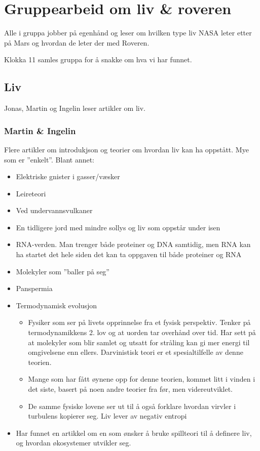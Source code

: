 \documentclass[5p]{elsarticle}
\begin{document}
\section*{Gruppearbeid om liv \& roveren}
Alle i gruppa jobber på egenhånd og leser om hvilken type liv NASA leter etter på Mars og hvordan de leter der med Roveren. 

Klokka 11 samles gruppa for å snakke om hva vi har funnet.

\subsection*{Liv}
Jonas, Martin og Ingelin leser artikler om liv.

\subsubsection*{Martin \& Ingelin}
Flere artikler om introdukjson og teorier om hvordan liv kan ha oppstått. Mye som er ''enkelt''. Blant annet:

\begin{itemize}
\item Elektriske gnister i gasser/væsker
\item Leireteori
\item Ved undervannsvulkaner
\item En tidligere jord med mindre sollys og liv som oppstår under isen
\item RNA-verden. Man trenger både proteiner og DNA samtidig, men RNA kan ha startet det hele siden det kan ta oppgaven til både proteiner og RNA
\item Molekyler som ''baller på seg''
\item Panspermia
\item Termodynamisk evolusjon
\begin{itemize}
\item Fysiker som ser på livets opprinnelse fra et fysisk perspektiv. Tenker på termodynamikkens 2. lov og at uorden tar overhånd over tid. Har sett på at molekyler som blir samlet og utsatt for stråling kan gi mer energi til omgivelsene enn ellers. Darvinistisk teori er et spesialtilfelle av denne teorien.
\item Mange som har fått øynene opp for denne teorien, kommet litt i vinden i det siste, basert på noen andre teorier fra før, men videreutviklet.
\item De samme fysiske lovene ser ut til å også forklare hvordan virvler i turbulens kopierer seg. Liv lever av negativ entropi
\end{itemize}
\item Har funnet en artikkel om en som ønsker å bruke spillteori til å definere liv, og hvordan økosystemer utvikler seg.
\end{itemize}
\end{document}
